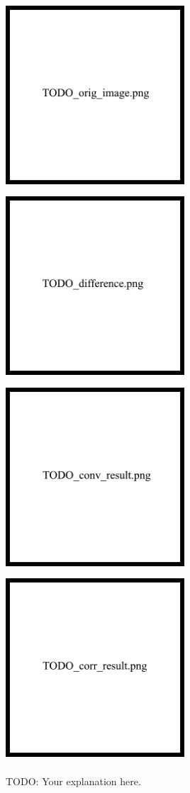 \documentclass{csci1430}
\begin{document}
\begin{answer}
    \includegraphics[width=0.5\textwidth,height=7cm,keepaspectratio]{images/TODO_orig_img.png}
    \includegraphics[width=0.5\textwidth,height=7cm,keepaspectratio]{images/TODO_difference.png}\\
    \includegraphics[width=0.5\textwidth,height=7cm,keepaspectratio]{images/TODO_conv_res.png}
    \includegraphics[width=0.5\textwidth,height=7cm,keepaspectratio]{images/TODO_corr_res.png}
    
    TODO: Your explanation here.
\end{answer}
\end{document}
